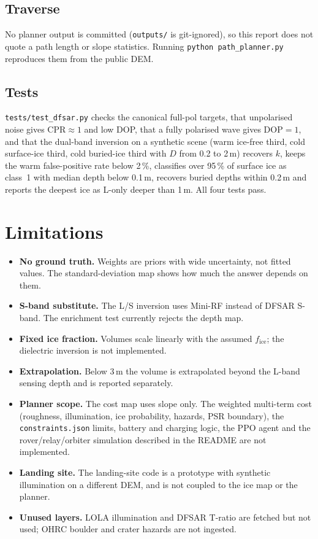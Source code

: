 \documentclass[11pt,a4paper]{article}
\newcommand{\code}[1]{\texttt{#1}}
\begin{document}
\subsection{Traverse}
No planner output is committed (\code{outputs/} is git-ignored), so this report does not quote a
path length or slope statistics. Running \code{python path\_planner.py} reproduces them from the
public DEM.

\subsection{Tests}
\code{tests/test\_dfsar.py} checks the canonical full-pol targets, that unpolarised noise gives
$\mathrm{CPR}\approx1$ and low DOP, that a fully polarised wave gives $\mathrm{DOP}=1$, and that
the dual-band inversion on a synthetic scene (warm ice-free third, cold surface-ice third, cold
buried-ice third with $D$ from 0.2 to 2\,m) recovers $k$, keeps the warm false-positive rate
below 2\,\%, classifies over 95\,\% of surface ice as class~1 with median depth below 0.1\,m,
recovers buried depths within 0.2\,m and reports the deepest ice as L-only deeper than 1\,m. All
four tests pass.

\section{Limitations}\label{sec:limits}

\begin{itemize}
  \item \textbf{No ground truth.} Weights are priors with wide uncertainty, not fitted values.
        The standard-deviation map shows how much the answer depends on them.
  \item \textbf{S-band substitute.} The L/S inversion uses Mini-RF instead of DFSAR S-band.
        The enrichment test currently rejects the depth map.
  \item \textbf{Fixed ice fraction.} Volumes scale linearly with the assumed $f_{\mathrm{ice}}$;
        the dielectric inversion is not implemented.
  \item \textbf{Extrapolation.} Below 3\,m the volume is extrapolated beyond the L-band sensing
        depth and is reported separately.
  \item \textbf{Planner scope.} The cost map uses slope only. The weighted multi-term cost
        (roughness, illumination, ice probability, hazards, PSR boundary), the
        \code{constraints.json} limits, battery and charging logic, the PPO agent and the
        rover/relay/orbiter simulation described in the README are not implemented.
  \item \textbf{Landing site.} The landing-site code is a prototype with synthetic illumination
        on a different DEM, and is not coupled to the ice map or the planner.
  \item \textbf{Unused layers.} LOLA illumination and DFSAR T-ratio are fetched but not used;
        OHRC boulder and crater hazards are not ingested.
\end{itemize}
\end{document}
